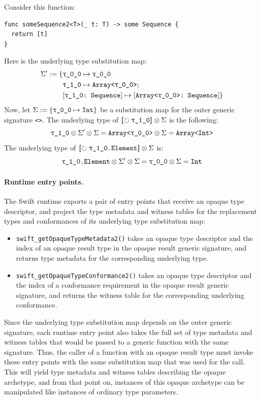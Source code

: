 \documentclass[../generics]{subfiles}
\begin{document}
\begin{example}\label{opaque archetype underlying type example}
Consider this function:
\begin{Verbatim}
func someSequence2<T>(_ t: T) -> some Sequence {
  return [t]
}
\end{Verbatim}
Here is the underlying type substitution map:
\begin{align*}
\Sigma' := \SubstMapC{
&\SubstType{\rT}{\rT}\\
&\SubstType{\rO}{Array<\rT>}
}{\\
&\SubstConf{\rO}{Array<\rT>}{Sequence}
}
\end{align*}
Now, let $\Sigma := \SubstMap{\SubstType{\rT}{Int}}$ be a substitution map for the outer generic signature \texttt{<\rT>}. The underlying type of $\Oy \otimes \Sigma$ is the following:
\[
\rO \otimes \Sigma' \otimes \Sigma = \texttt{Array<\rT>} \otimes \Sigma = \texttt{Array<Int>}
\]
The underlying type of $\Opaque{\rO.Element} \otimes \Sigma$ is:
\[
\texttt{\rO.Element} \otimes \Sigma' \otimes \Sigma = \texttt{\rT} \otimes \Sigma = \texttt{Int}
\]
\end{example}

\paragraph{Runtime entry points.} The Swift runtime exports a pair of entry points that receive an opaque type descriptor, and project the type metadata and witness tables for the replacement types and conformances of its underlying type substitution map:
\begin{itemize}
\item \verb|swift_getOpaqueTypeMetadata2()| takes an opaque type descriptor and the index of an opaque result type in the opaque result generic signature, and returns type metadata for the corresponding underlying type.
\item \verb|swift_getOpaqueTypeConformance2()| takes an opaque type descriptor and the index of a conformance requirement in the opaque result generic signature, and returns the witness table for the corresponding underlying conformance.
\end{itemize}
Since the underlying type substitution map depends on the outer generic signature, each runtime entry point also takes the full set of type metadata and witness tables that would be passed to a generic function with the same signature. Thus, the caller of a function with an opaque result type must invoke these entry points with the same substitution map that was used for the call. This will yield type metadata and witness tables describing the opaque archetype, and from that point on, instances of this opaque archetype can be manipulated like instances of ordinary type parameters.
\end{document}
